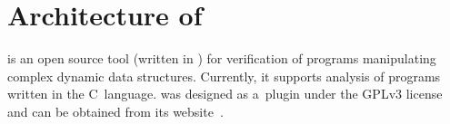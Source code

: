 {%
%


\section{Architecture of \forester}
\label{sub:forestervata}

\forester is an open source tool (written in \cpp) for verification of programs
manipulating complex dynamic data structures.
Currently, it supports analysis of programs written in the C~language.
\forester was designed as a~\gcc plugin under the GPLv3 license
and can be obtained from its website~\cite{foresterweb}.%

}
